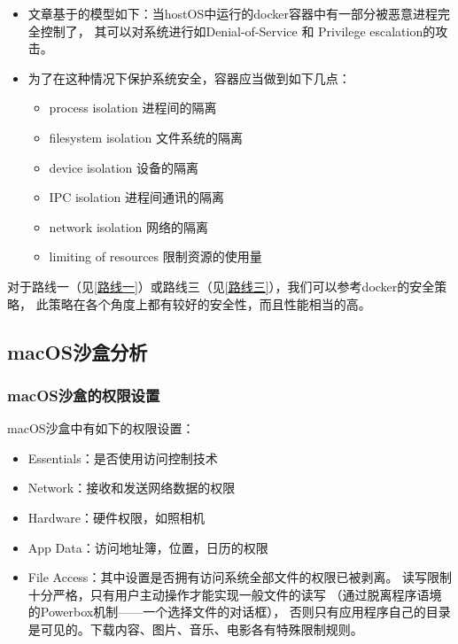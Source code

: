 \documentclass[AutoFakeBold,a4paper]{ctexart}
\begin{document}
\begin{itemize}
    \item 文章基于的模型如下：当hostOS中运行的docker容器中有一部分被恶意进程完全控制了，
    其可以对系统进行如Denial-of-Service 和 Privilege escalation的攻击。
    \item 为了在这种情况下保护系统安全，容器应当做到如下几点：
    \begin{itemize}
        \item process isolation 进程间的隔离
        \item filesystem isolation  文件系统的隔离
        \item device isolation  设备的隔离
        \item IPC isolation 进程间通讯的隔离
        \item network isolation 网络的隔离
        \item limiting of resources 限制资源的使用量
    \end{itemize}
\end{itemize}

对于路线一（见\ref{路线一}）或路线三（见\ref{路线三}），我们可以参考docker的安全策略，
此策略在各个角度上都有较好的安全性，而且性能相当的高。

\subsection{macOS沙盒分析}

\subsubsection{macOS沙盒的权限设置}

macOS沙盒中有如下的权限设置\cite{hoog2011iphone}：

\begin{itemize}
    \item Essentials：是否使用访问控制技术
    \item Network：接收和发送网络数据的权限
    \item Hardware：硬件权限，如照相机
    \item App Data：访问地址簿，位置，日历的权限
    \item File Access：其中设置是否拥有访问系统全部文件的权限已被剥离。
    读写限制十分严格，只有用户主动操作才能实现一般文件的读写
    （通过脱离程序语境的Powerbox机制——一个选择文件的对话框），
    否则只有应用程序自己的目录是可见的。下载内容、图片、音乐、电影各有特殊限制规则。
\end{itemize}
\end{document}
